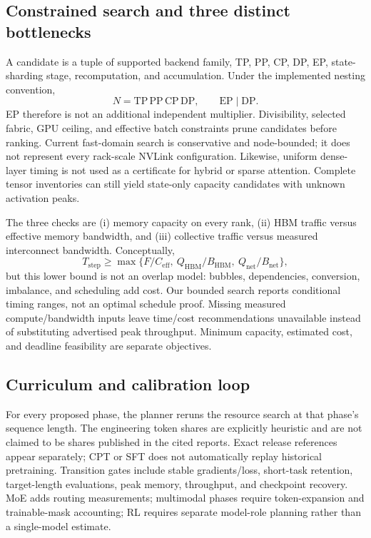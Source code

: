 \documentclass[10pt]{article}
\begin{document}
\subsection{Constrained search and three distinct bottlenecks}
A candidate is a tuple of supported backend family, TP, PP, CP, DP, EP, state-sharding stage, recomputation, and accumulation. Under the implemented nesting convention,
\[
N=\mathrm{TP}\,\mathrm{PP}\,\mathrm{CP}\,\mathrm{DP},\qquad
\mathrm{EP}\mid\mathrm{DP}.
\]
EP therefore is not an additional independent multiplier. Divisibility, selected fabric, GPU ceiling, and effective batch constraints prune candidates before ranking. Current fast-domain search is conservative and node-bounded; it does not represent every rack-scale NVLink configuration. Likewise, uniform dense-layer timing is not used as a certificate for hybrid or sparse attention. Complete tensor inventories can still yield state-only capacity candidates with unknown activation peaks.

The three checks are (i) memory capacity on every rank, (ii) HBM traffic versus effective memory bandwidth, and (iii) collective traffic versus measured interconnect bandwidth. Conceptually,
\[
T_{\mathrm{step}}\geq\max\{F/C_{\mathrm{eff}},\ Q_{\mathrm{HBM}}/B_{\mathrm{HBM}},\
Q_{\mathrm{net}}/B_{\mathrm{net}}\},
\]
but this lower bound is not an overlap model: bubbles, dependencies, conversion, imbalance, and scheduling add cost. Our bounded search reports conditional timing ranges, not an optimal schedule proof. Missing measured compute/bandwidth inputs leave time/cost recommendations unavailable instead of substituting advertised peak throughput. Minimum capacity, estimated cost, and deadline feasibility are separate objectives.

\subsection{Curriculum and calibration loop}
For every proposed phase, the planner reruns the resource search at that phase's sequence length. The engineering token shares are explicitly heuristic and are not claimed to be shares published in the cited reports. Exact release references appear separately; CPT or SFT does not automatically replay historical pretraining. Transition gates include stable gradients/loss, short-task retention, target-length evaluations, peak memory, throughput, and checkpoint recovery. MoE adds routing measurements; multimodal phases require token-expansion and trainable-mask accounting; RL requires separate model-role planning rather than a single-model estimate.
\end{document}
